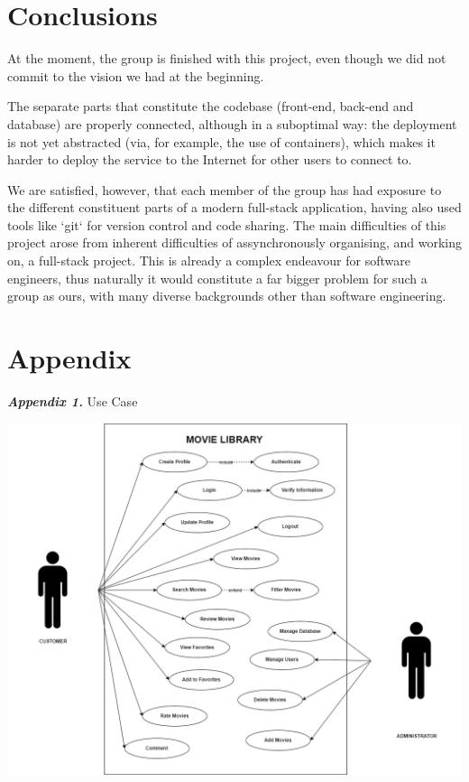 \documentclass[letterpaper,twocolumn]{article}
\newcommand{\myparagraph}[1]{\vspace{0.1cm}\noindent \textbf{\textit{#1.}}}
\begin{document}
\section{Conclusions}

At the moment, the group is finished with this project, even though we did not commit to the vision we had at the beginning.

The separate parts that constitute the codebase (front-end, back-end and database) are properly connected, although in a suboptimal way: the deployment is not yet abstracted (via, for example, the use of containers), which makes it harder to deploy the service to the Internet for other users to connect to.

We are satisfied, however, that each member of the group has had exposure to the different constituent parts of a modern full-stack application, having also used tools like `git` for version control and code sharing. The main difficulties of this project arose from inherent difficulties of assynchronously organising, and working on, a full-stack project. This is already a complex endeavour for software engineers, thus naturally it would constitute a far bigger problem for such a group as ours, with many diverse backgrounds other than software engineering.

\clearpage

\vfill %

\section{Appendix}

\myparagraph{Appendix 1} Use Case
\vspace{2ex}

\includegraphics[scale=0.40]{images/USE CASE WET.drawio.png}\\[0.1cm] 
\end{document}
